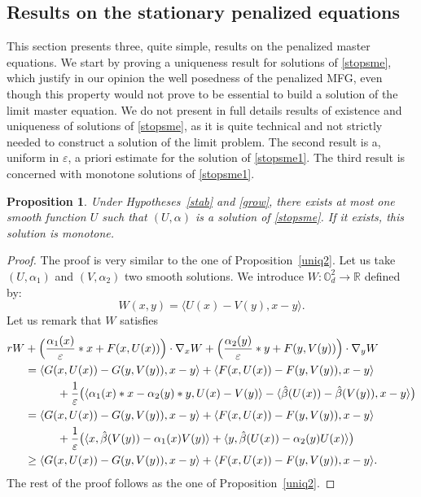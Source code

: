 \documentclass[10pt]{amsart}
\let\epsilon\varepsilon
\newtheorem{Prop}{Proposition}[section]
\theoremstyle{definition}
\begin{document}
\subsection{Results on the stationary penalized equations}
This section presents three, quite simple, results on the penalized master equations. We start by proving a uniqueness result for solutions of \eqref{stopsme}, which justify in our opinion the well posedness of the penalized MFG, even though this property would not prove to be essential to build a solution of the limit master equation. We do not present in full details results of existence and uniqueness of solutions of \eqref{stopsme}, as it is quite technical and not strictly needed to construct a solution of the limit problem. The second result is a, uniform in $\epsilon$, a priori estimate for the solution of \eqref{stopsme1}. The third result is concerned with monotone solutions of \eqref{stopsme1}.
\begin{Prop}
Under Hypotheses~\ref{stab} and \ref{grow}, there exists at most one smooth function $U$ such that $(U,\alpha)$ is a solution of \eqref{stopsme}. If it exists, this solution is monotone.
\end{Prop}
\begin{proof}
The proof is very similar to the one of Proposition~\ref{uniq2}. Let us take $(U,\alpha_1)$ and $(V,\alpha_2)$ two smooth solutions. We introduce $W: \mathbb{O}_d^2 \to \mathbb{R}$ defined by:
\begin{equation*}
W(x,y) = \langle U(x)-V(y), x- y\rangle.
\end{equation*}
Let us remark that $W$ satisfies
\begin{equation*}
\begin{aligned}
r W&+\Bigl(\frac{\alpha_1(x)}{\epsilon} *x+F(x,U(x))\Bigr)\cdot \nabla_x W+\Bigl(\frac{\alpha_2(y)}{\epsilon}*y+F(y,V(y))\Bigr)\cdot \nabla_y W\\
&=\langle G(x,U(x))-G(y,V(y)),x-y\rangle+\langle F(x,U(x))-F(y,V(y)), x-y\rangle\\
&\hspace*{1cm}+ \frac{1}{\epsilon} \bigl(\langle \alpha_1(x)*x-\alpha_2(y)*y, U(x)-V(y)\rangle-\langle \hat{\beta}(U(x))-\hat{\beta}(V(y)), x-y \rangle \bigr)\\
&= \langle G(x,U(x))-G(y,V(y)),x-y\rangle+\langle F(x,U(x))-F(y,V(y)), x-y\rangle\\
&\hspace*{1cm}+ \frac{1}{\epsilon} \bigl(\langle x, \hat{\beta}(V(y))-\alpha_1(x)V(y)\rangle+\langle y, \hat{\beta}(U(x))-\alpha_2(y)U(x)\rangle \bigr)\\
&\geq \langle G(x,U(x))-G(y,V(y)),x-y\rangle+\langle F(x,U(x))-F(y,V(y)), x-y\rangle.
\end{aligned}
\end{equation*}
The rest of the proof follows as the one of Proposition~\ref{uniq2}.
\end{proof}
\end{document}

